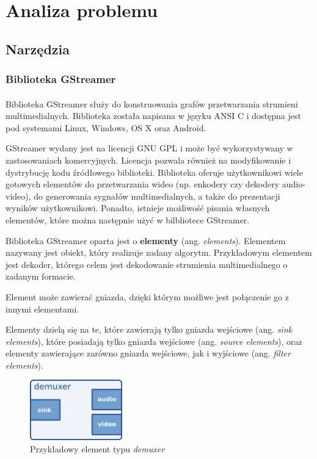 \documentclass[12pt]{article}
\begin{document}
\section{Analiza problemu}
\subsection{Narzędzia}
\subsubsection{Biblioteka GStreamer}
\paragraph{}
Biblioteka GStreamer służy do konstruowania grafów przetwarzania strumieni multimedialnych. Biblioteka została napisana w języku ANSI C i dostępna jest pod systemami Linux, Windows, OS X oraz Android.

GStreamer wydany jest na licencji GNU GPL i może być wykorzystywany w zastosowaniach komercyjnych. Licencja pozwala również na modyfikowanie i dystrybucję kodu źródłowego biblioteki.
Biblioteka oferuje użytkownikowi wiele gotowych elementów do przetwarzania wideo (np. enkodery czy dekodery audio-video), do generowania sygnałów multimedialnych, a także do prezentacji wyników użytkownikowi. Ponadto, istnieje możliwość pisania własnych elementów, które można następnie użyć w bilbliotece GStreamer.

Biblioteka GStreamer oparta jest o \textbf{elementy} (ang. \textit{elements}). Elementem nazywany jest obiekt, który realizuje zadany algorytm. Przykładowym elementem jest dekoder, którego celem jest dekodowanie strumienia multimedialnego o zadanym formacie.

Element może zawierać gniazda, dzięki którym możliwe jest połączenie go z innymi elementami.

Elementy dzielą się na te, które zawierają tylko gniazda wejściowe (ang. \textit{sink elements}), które posiadają tylko gniazda wejściowe (ang. \textit{source elements}), oraz elementy zawierające zarówno gniazda wejściowe, jak i wyjściowe (ang. \textit{filter elements}).
\begin{figure}[H]
  \includegraphics[width=40mm]{img/sample-demuxer.png}
  \caption{Przykładowy element typu \textit{demuxer} \cite{gstmainpage}}
  \label{fig:sampleDemuxer}
\end{figure}
\end{document}
